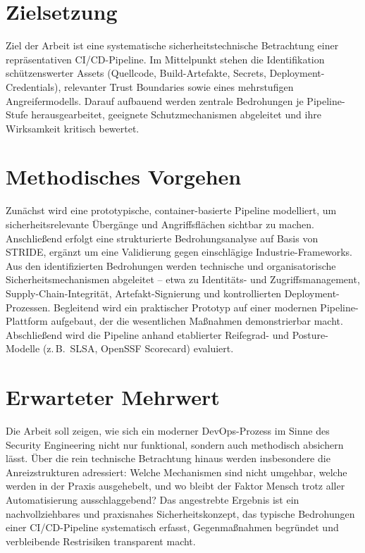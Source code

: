 \documentclass[12pt, a4paper]{scrartcl}
\begin{document}
\section*{Zielsetzung}
Ziel der Arbeit ist eine systematische sicherheitstechnische Betrachtung einer
repräsentativen CI/CD-Pipeline. Im Mittelpunkt stehen die Identifikation
schützenswerter Assets (Quellcode, Build-Artefakte, Secrets, Deployment-Credentials),
relevanter Trust Boundaries sowie eines mehrstufigen Angreifermodells.
Darauf aufbauend werden zentrale Bedrohungen je Pipeline-Stufe herausgearbeitet,
geeignete Schutzmechanismen abgeleitet und ihre Wirksamkeit kritisch bewertet.

\section*{Methodisches Vorgehen}
Zunächst wird eine prototypische, container-basierte Pipeline modelliert, um
sicherheitsrelevante Übergänge und Angriffsflächen sichtbar zu machen. Anschließend
erfolgt eine strukturierte Bedrohungsanalyse auf Basis von STRIDE, ergänzt um eine
Validierung gegen einschlägige Industrie-Frameworks. Aus den identifizierten
Bedrohungen werden technische und organisatorische Sicherheitsmechanismen abgeleitet
-- etwa zu Identitäts- und Zugriffsmanagement, Supply-Chain-Integrität, Artefakt-Signierung
und kontrollierten Deployment-Prozessen. Begleitend wird ein praktischer Prototyp auf
einer modernen Pipeline-Plattform aufgebaut, der die wesentlichen Maßnahmen
demonstrierbar macht. Abschließend wird die Pipeline anhand etablierter Reifegrad- und
Posture-Modelle (z.\,B.\ SLSA, OpenSSF Scorecard) evaluiert.

\section*{Erwarteter Mehrwert}
Die Arbeit soll zeigen, wie sich ein moderner DevOps-Prozess im Sinne des Security
Engineering nicht nur funktional, sondern auch methodisch absichern lässt. Über die
rein technische Betrachtung hinaus werden insbesondere die Anreizstrukturen
adressiert: Welche Mechanismen sind nicht umgehbar, welche werden in der Praxis
ausgehebelt, und wo bleibt der Faktor Mensch trotz aller Automatisierung
ausschlaggebend? Das angestrebte Ergebnis ist ein nachvollziehbares und praxisnahes
Sicherheitskonzept, das typische Bedrohungen einer CI/CD-Pipeline systematisch erfasst,
Gegenmaßnahmen begründet und verbleibende Restrisiken transparent macht.
\end{document}
